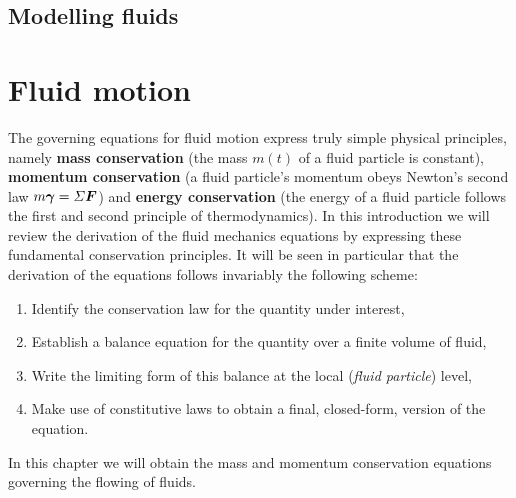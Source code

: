 \newpage
\section*{Modelling fluids}
\chapter{Fluid motion}
\label{chap:fluid-motion}

The governing equations for fluid motion express truly simple physical principles, namely \textbf{mass conservation} (the mass $m(t)$ of a fluid particle is constant), \textbf{momentum conservation} (a fluid particle's momentum obeys Newton's second law $m \matrixsym \gamma = \Sigma \bF$) and \textbf{energy conservation} (the energy of a fluid particle follows the first and second principle of thermodynamics).  In this introduction we will review the derivation of the fluid mechanics equations by expressing these fundamental conservation principles. It will be seen in particular that the derivation of the equations follows invariably the following scheme:
\begin{enumerate}
\item Identify the conservation law for the quantity under interest,
\item Establish a balance equation for the quantity over a finite volume of fluid,
\item Write the limiting form of this balance at the local (\textit{fluid particle}) level,
\item Make use of constitutive laws to obtain a final, closed-form, version of the equation.
\end{enumerate}
In this chapter we will obtain the mass and momentum conservation equations governing the flowing of fluids.

